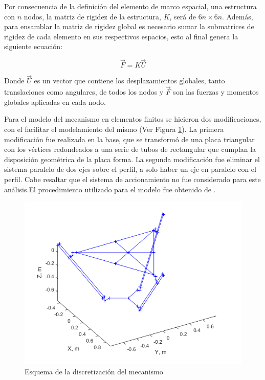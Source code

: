 Por consecuencia de la definición del elemento de marco espacial, una estructura con $n$ nodos, la matriz de rigidez de la estructura, $K$, será de $6n\times6n$. Además, para ensamblar la matriz de rigidez global es necesario sumar la submatrices de rigidez de cada elemento en sus respectivos espacios, esto al final genera la siguiente ecuación:

\begin{equation}
    \vec{F} = K \vec{U}
\end{equation}

Donde $\vec{U}$ es un vector que contiene los desplazamientos globales, tanto translaciones como angulares, de todos los nodos y $\vec{F}$ son las fuerzas y momentos globales aplicadas en cada nodo.

Para el modelo del mecanismo en elementos finitos se hicieron dos modificaciones, con el facilitar el modelamiento del mismo (Ver Figura \ref{fig:MecanismoDiscretizado}). La primera modificación fue realizada en la base, que se transformó de una placa triangular con los vértices redondeados a una serie de tubos de rectangular que cumplan la disposición geométrica de la placa forma. La segunda modificación fue eliminar el sistema paralelo de dos ejes sobre el perfil, a solo haber un eje en paralelo con el perfil. Cabe resaltar que el sistema de accionamiento no fue considerado para este análisis.El procedimiento utilizado para el modelo fue obtenido de \cite{kattan2010matlab}.

\begin{figure}[hbt!]
    \centering
    \includegraphics[width=\textwidth]{Cap4_DisenoBasico/Figura/AnalisisRigidez/MecanismoDiscretizado.png}
    \caption{Esquema de la discretización del mecanismo}
    \label{fig:MecanismoDiscretizado}
\end{figure}
\newpage

